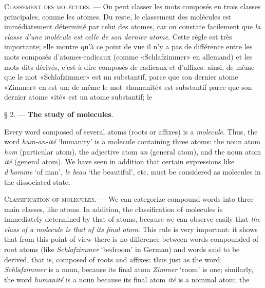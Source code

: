 \begin{sloppypar}
{    \textsc{Classement des molécules}. — On peut classer les mots
    composés en trois classes principales, comme les atomes. Du reste,
    le classement des molécules est immédiatement déterminé par celui
    des atomes, car on constate facilement que \emph{la classe d’une
      molécule est celle de son dernier atome}. Cette règle est très
    importante; elle montre qu’à ce point de vue il n’y a pas de
    différence entre les mots composés d’atomes-radicaux (comme
    «Schlafzimmer» en allemand) et les mots dits dérivés, c’est-à-dire
    composés de radicaux et d’affixes: ainsi, de même que le mot
    «Schlafzimmer» est un substantif, parce que son dernier atome
    «Zimmer» en est un; de même le mot «humanité» est substantif parce
    que son dernier atome «ité» est un atome substantif; le }%
  {\begin{center}
      § 2. — \textbf{The study of molecules}.
    \end{center}

    Every word composed of several atoms (roots or affixes) is a
    \emph{molecule}. Thus, the word \emph{hum-an-ité} `humanity' is
    a molecule containing three atoms: the noun atom \emph{hom}
    (particular atom), the adjective atom \emph{an} (general atom),
    and the noun atom \emph{ité} (general atom). We have seen in
    addition that certain expressions like \emph{d'homme} `of man',
    \emph{le beau} `the beautiful', etc. must be considered as
    molecules in the dissociated state.

    \textsc{Classification of molecules.}  --- We can categorize
    compound words into three main classes, like atoms. In addition,
    the classification of molecules is immediately determined by that
    of atoms, because we can observe easily that \emph{the class of a
      molecule is that of its final atom}. This rule is very
    important: it shows that from this point of view there is no
    difference between words compounded of root atoms (like
    \emph{Schlafzimmer} `bedroom' in German) and words said to be
    derived, that is, composed of roots and affixes: thus just as the
    word \emph{Schlafzimmer} is a noun, because its final atom
    \emph{Zimmer} `room' is one; similarly, the word \emph{humanité}
    is a noun because its final atom \emph{ité} is a nominal atom;
    the }

\end{sloppypar}
